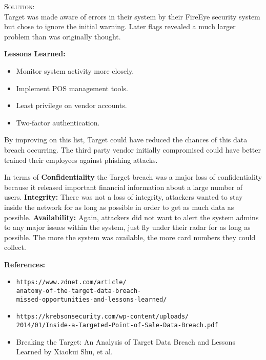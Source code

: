 \documentclass[12pt]{article}
\newenvironment{solution}
    {\textsc{Solution:}\\}
    {\newpage}%
\begin{document}
\begin{solution}
		Target was made aware of errors in their system by their FireEye security system but chose
		to ignore the initial warning. Later flags revealed a much larger problem than was
		originally thought.

		\textbf{Lessons Learned:}
		\begin{itemize}
			\item Monitor system activity more closely.
			\item Implement POS management tools.
			\item Least privilege on vendor accounts.
			\item Two-factor authentication.
		\end{itemize}
		By improving on this list, Target could have reduced the chances of this data breach
		occurring. The third party vendor initially compromised could have better trained
		their employees against phishing attacks.

		In terms of \textbf{Confidentiality} the Target breach was a major loss of confidentiality
		because it released important financial information about a large number of users.
		\textbf{Integrity:} There was not a loss of integrity, attackers wanted to stay
		inside the network for as long as possible in order to get as much data as possible.
		\textbf{Availability:} Again, attackers did not want to alert the system admins
		to any major issues within the system, just fly under their radar for as long as possible.
		The more the system was available, the more card numbers they could collect.

		\textbf{References:}
		\begin{itemize}
			\item \texttt{https://www.zdnet.com/article/\\anatomy-of-the-target-data-breach-\\missed-opportunities-and-lessons-learned/}
			\item \texttt{https://krebsonsecurity.com/wp-content/uploads/\\2014/01/Inside-a-Targeted-Point-of-Sale-Data-Breach.pdf}
			\item Breaking the Target: An Analysis of Target Data Breach and Lessons Learned by Xiaokui Shu, et al.
		\end{itemize}

	\end{solution}
\end{document}

